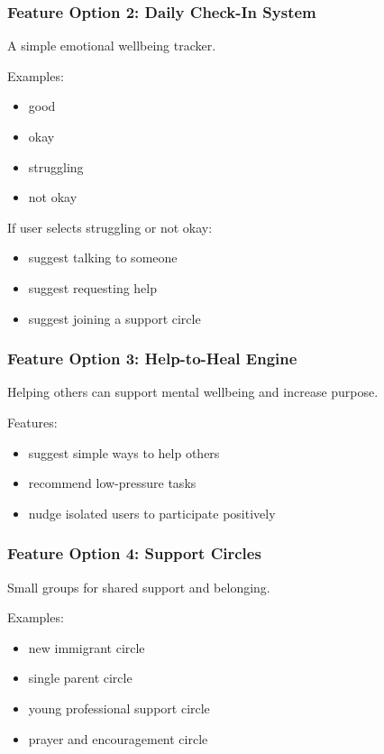 \documentclass[11pt]{article}
\begin{document}
\subsubsection{Feature Option 2: Daily Check-In System}
A simple emotional wellbeing tracker.

Examples:
\begin{itemize}[leftmargin=1.5em]
    \item good
    \item okay
    \item struggling
    \item not okay
\end{itemize}

If user selects struggling or not okay:
\begin{itemize}[leftmargin=1.5em]
    \item suggest talking to someone
    \item suggest requesting help
    \item suggest joining a support circle
\end{itemize}

\subsubsection{Feature Option 3: Help-to-Heal Engine}
Helping others can support mental wellbeing and increase purpose.

Features:
\begin{itemize}[leftmargin=1.5em]
    \item suggest simple ways to help others
    \item recommend low-pressure tasks
    \item nudge isolated users to participate positively
\end{itemize}

\subsubsection{Feature Option 4: Support Circles}
Small groups for shared support and belonging.

Examples:
\begin{itemize}[leftmargin=1.5em]
    \item new immigrant circle
    \item single parent circle
    \item young professional support circle
    \item prayer and encouragement circle
\end{itemize}
\end{document}
